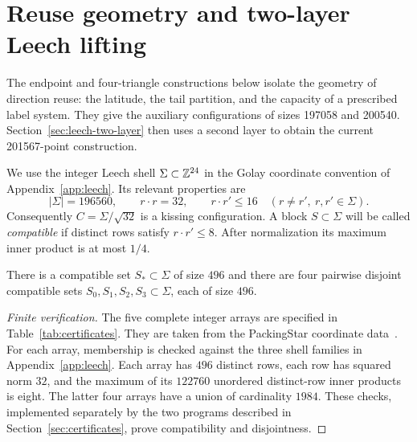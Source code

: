 \section{Reuse geometry and two-layer Leech lifting}\label{sec:leech}

The endpoint and four-triangle constructions below isolate the geometry
of direction reuse: the latitude, the tail partition, and the capacity
of a prescribed label system. They give the auxiliary configurations
of sizes 197058 and 200540. Section~\ref{sec:leech-two-layer} then
uses a second layer to obtain the current 201567-point construction.

We use the integer Leech shell $\Sigma\subset\mathbb Z^{24}$ in the Golay
coordinate convention of Appendix~\ref{app:leech}. Its relevant
properties are
\begin{equation}\label{eq:leech-shell}
 |\Sigma|=196560,\qquad r\cdot r=32,\qquad
 r\cdot r'\le16\quad(r\ne r',\ r,r'\in\Sigma).
\end{equation}
Consequently $C=\Sigma/\sqrt{32}$ is a kissing configuration. A block
$S\subset\Sigma$ will be called \emph{compatible} if distinct rows
satisfy $r\cdot r'\le8$. After normalization its maximum inner product
is at most $1/4$.

\begin{lemma}\label{lem:leech-blocks}
There is a compatible set $S_*\subset\Sigma$ of size $496$ and there
are four pairwise disjoint compatible sets $S_0,S_1,S_2,S_3\subset\Sigma$,
each of size $496$.
\end{lemma}
\begin{proof}[Finite verification]
The five complete integer arrays are specified in
Table~\ref{tab:certificates}. They are taken from the
PackingStar coordinate data~\cite{packingstar-data}.
For each array, membership is checked against the three shell families
in Appendix~\ref{app:leech}. Each array has $496$ distinct rows, each
row has squared norm $32$, and the maximum of its $122760$ unordered
distinct-row inner products is eight. The latter four arrays have a
union of cardinality $1984$. These checks, implemented separately by
the two programs described in Section~\ref{sec:certificates}, prove
compatibility and disjointness.
\end{proof}

